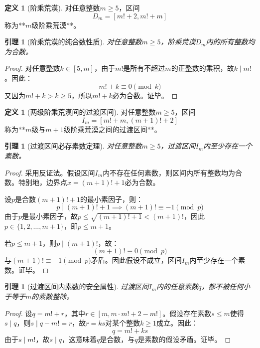 \documentclass[12pt,a4paper,reqno]{amsart}
\theoremstyle{plain}
\newtheorem{lemma}[theorem]{引理}
\theoremstyle{definition}
\newtheorem{definition}[theorem]{定义}
\theoremstyle{remark}
\begin{document}
	\begin{definition}[阶乘荒漠]
		对任意整数$m \ge 5$，区间
		\[
		D_m = [m!+2, m!+m]
		\]
		称为**$m$级阶乘荒漠**。
	\end{definition}
	
	\begin{lemma}[阶乘荒漠的纯合数性质]
		对任意整数$m \ge 5$，阶乘荒漠$D_m$内的所有整数均为合数。
	\end{lemma}
	
	\begin{proof}
		对任意整数$k \in [5, m]$，由于$m!$是所有不超过$m$的正整数的乘积，故$k \mid m!$。因此：
		\[
		m!+k \equiv 0 \pmod{k}
		\]
		又因为$m!+k > k \ge 5$，所以$m!+k$必为合数。证毕。
	\end{proof}
	
	\begin{definition}[两级阶乘荒漠间的过渡区间]
		对任意整数$m \ge 5$，区间
		\[
		I_m = [m!+m, (m+1)!+2]
		\]
		称为**$m$级与$m+1$级阶乘荒漠之间的过渡区间**。
	\end{definition}
	
	\begin{lemma}[过渡区间必存素数定理]
		对任意整数$m \ge 5$，过渡区间$I_m$内至少存在一个素数。
	\end{lemma}
	
	\begin{proof}
		采用反证法。假设区间$I_m$内不存在任何素数，则区间内所有整数均为合数。特别地，边界点$x=(m+1)!+1$必为合数。
		
		设$p$是合数$(m+1)!+1$的最小素因子，则：
		\[
		p \mid (m+1)!+1 \implies (m+1)! \equiv -1 \pmod{p}
		\]
		由于$p$是最小素因子，故$p \le \sqrt{(m+1)!+1} < (m+1)!$，因此$p \in \{1,2,\dots,m+1\}$，即$p \le m+1$。
		
		若$p \le m+1$，则$p \mid (m+1)!$，故：
		\[
		(m+1)! \equiv 0 \pmod{p}
		\]
		与$(m+1)! \equiv -1 \pmod{p}$矛盾。因此假设不成立，区间$I_m$内至少存在一个素数。证毕。
	\end{proof}
	
	\begin{lemma}[过渡区间内素数的安全属性]
		过渡区间$I_m$内的任意素数$q$，都不被任何小于等于$m$的素数整除。
	\end{lemma}
	
	\begin{proof}
		设$q = m!+r$，其中$r \in [m, m \cdot m! + 2 - m!]$。假设存在素数$s \le m$使得$s \mid q$，则$s \mid q - m! = r$，故$r = k s$对某个整数$k \ge 1$成立。因此：
		\[
		q = m! + k s
		\]
		由于$s \mid m!$，故$s \mid q$，这意味着$q$是合数，与$q$是素数的假设矛盾。证毕。
	\end{proof}
	
\end{document}
